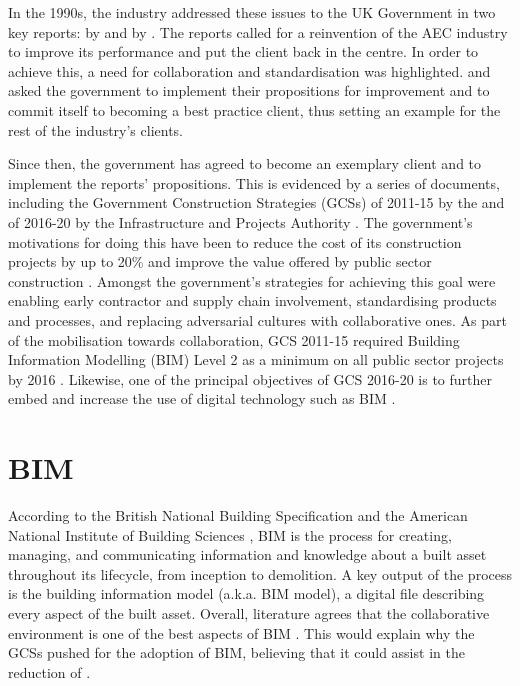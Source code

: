 In the 1990s, the industry addressed these issues to the UK Government in two key reports:  by \cite{Latham1994} and  by \cite{Egan1998}.
The reports called for a reinvention of the AEC industry to improve its performance and put the client back in the centre.
In order to achieve this, a need for collaboration and standardisation was highlighted.
\cite{Latham1994} and \cite{Egan1998} asked the government to implement their propositions for improvement and to commit itself to becoming a best practice client, thus setting an example for the rest of the industry's clients.


Since then, the government has agreed to become an exemplary client and to implement the reports' propositions.
This is evidenced by a series of documents, including the Government Construction Strategies (GCSs) of 2011-15 by the \cite{GCS11-15} and of 2016-20 by the Infrastructure and Projects Authority \citep{GCS16-20}.
The government's motivations for doing this have been to reduce the cost of its construction projects by up to 20\% and improve the value offered by public sector construction \citep{GCS11-15}.
Amongst the government's strategies for achieving this goal were enabling early contractor and supply chain involvement, standardising products and processes, and replacing adversarial cultures with collaborative ones.
As part of the mobilisation towards collaboration, GCS 2011-15 required Building Information Modelling (BIM) Level 2 as a minimum on all public sector projects by 2016 \citep{GCS11-15}.
Likewise, one of the principal objectives of GCS 2016-20 is to further embed and increase the use of digital technology such as BIM \citep{GCS16-20}.


\section{BIM} \label{bim}
According to the British National Building Specification \citep{NBS2016} and the American National Institute of Building Sciences \citep{NIBSnd}, BIM is the process for creating, managing, and communicating information and knowledge about a built asset throughout its lifecycle, from inception to demolition.
A key output of the process is the building information model (a.k.a. BIM model), a digital file describing every aspect of the built asset.
Overall, literature agrees that the collaborative environment is one of the best aspects of BIM \citep{Santos2017}.
This would explain why the GCSs pushed for the adoption of BIM, believing that it could assist in the reduction of  \citep{NBS2014}.


